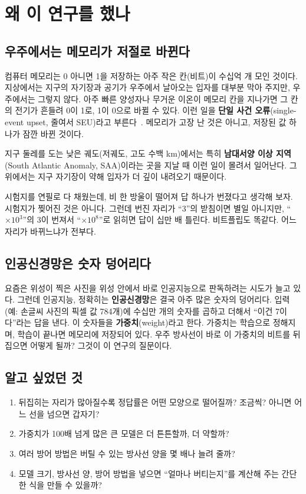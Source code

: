 \documentclass[11pt,a4paper]{article}
\newcounter{easy}
\begin{document}
\section{왜 이 연구를 했나}

\subsection{우주에서는 메모리가 저절로 바뀐다}
컴퓨터 메모리는 0 아니면 1을 저장하는 아주 작은 칸(비트)이 수십억 개 모인 것이다. 지상에서는 지구의 자기장과 공기가 우주에서 날아오는 입자를 대부분 막아 주지만, 우주에서는 그렇지 않다. 아주 빠른 양성자나 무거운 이온이 메모리 칸을 지나가면 그 칸의 전기가 흔들려 0이 1로, 1이 0으로 바뀔 수 있다. 이런 일을 \textbf{단일 사건 오류}(single-event upset, 줄여서 SEU)라고 부른다~\citep{baumann2005}. 메모리가 고장 난 것은 아니고, 저장된 값 하나가 잠깐 바뀐 것이다.

지구 둘레를 도는 낮은 궤도(저궤도, 고도 수백 km)에서는 특히 \textbf{남대서양 이상 지역}(South Atlantic Anomaly, SAA)이라는 곳을 지날 때 이런 일이 몰려서 일어난다. 그 위에서는 지구 자기장이 약해 입자가 더 깊이 내려오기 때문이다.

\begin{easy}[비트플립이란]
시험지를 연필로 다 채웠는데, 비 한 방울이 떨어져 답 하나가 번졌다고 생각해 보자. 시험지가 찢어진 것은 아니다. 그런데 번진 자리가 ``3''의 받침이면 별일 아니지만, ``$\times 10^{3}$''의 3이 번져서 ``$\times 10^{8}$''로 읽히면 답이 십만 배 틀린다. 비트플립도 똑같다. 어느 자리가 바뀌느냐가 전부다.
\end{easy}

\subsection{인공신경망은 숫자 덩어리다}
요즘은 위성이 찍은 사진을 위성 안에서 바로 인공지능으로 판독하려는 시도가 늘고 있다. 그런데 인공지능, 정확히는 \textbf{인공신경망}은 결국 아주 많은 숫자의 덩어리다. 입력(예: 손글씨 사진의 픽셀 값 784개)에 수십만 개의 숫자를 곱하고 더해서 ``이건 7이다''라는 답을 낸다. 이 숫자들을 \textbf{가중치}(weight)라고 한다. 가중치는 학습으로 정해지며, 학습이 끝나면 메모리에 저장되어 있다. 우주 방사선이 바로 이 가중치의 비트를 뒤집으면 어떻게 될까? 그것이 이 연구의 질문이다.

\subsection{알고 싶었던 것}
\begin{enumerate}[label=\textbf{질문 \arabic*.},leftmargin=*]
  \item 뒤집히는 자리가 많아질수록 정답률은 어떤 모양으로 떨어질까? 조금씩? 아니면 어느 선을 넘으면 갑자기?
  \item 가중치가 100배 넘게 많은 큰 모델은 더 튼튼할까, 더 약할까?
  \item 여러 방어 방법은 버틸 수 있는 방사선 양을 몇 배나 늘려 줄까?
  \item 모델 크기, 방사선 양, 방어 방법을 넣으면 ``얼마나 버티는지''를 계산해 주는 간단한 식을 만들 수 있을까?
\end{enumerate}
\end{document}
